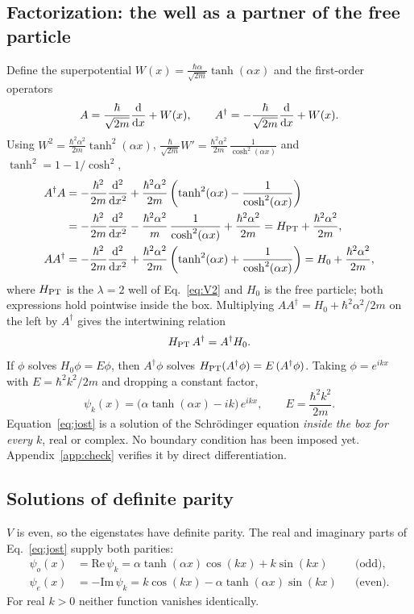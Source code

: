 \documentclass[11pt]{article}
\numberwithin{equation}{section}
\begin{document}
\subsection{Factorization: the well as a partner of the free particle}
Define the superpotential $W(x)=\frac{\hbar\alpha}{\sqrt{2m}}\tanh(\alpha x)$ and the first-order operators
\begin{equation}
A=\frac{\hbar}{\sqrt{2m}}\dv{x}+W(x),\qquad A^\dagger=-\frac{\hbar}{\sqrt{2m}}\dv{x}+W(x).
\end{equation}
Using $W^2=\frac{\hbar^2\alpha^2}{2m}\tanh^2(\alpha x)$, $\frac{\hbar}{\sqrt{2m}}W'=\frac{\hbar^2\alpha^2}{2m}\,\frac{1}{\cosh^2(\alpha x)}$ and $\tanh^2=1-1/\cosh^2$,
\begin{align}
A^\dagger A&=-\frac{\hbar^2}{2m}\dv[2]{x}+\frac{\hbar^2\alpha^2}{2m}\left(\tanh^2(\alpha x)-\frac{1}{\cosh^2(\alpha x)}\right)\nonumber\\
&=-\frac{\hbar^2}{2m}\dv[2]{x}-\frac{\hbar^2\alpha^2}{m}\,\frac{1}{\cosh^2(\alpha x)}+\frac{\hbar^2\alpha^2}{2m}=H_{\rm PT}+\frac{\hbar^2\alpha^2}{2m},\\
AA^\dagger&=-\frac{\hbar^2}{2m}\dv[2]{x}+\frac{\hbar^2\alpha^2}{2m}\left(\tanh^2(\alpha x)+\frac{1}{\cosh^2(\alpha x)}\right)=H_{0}+\frac{\hbar^2\alpha^2}{2m},
\end{align}
where $H_{\rm PT}$ is the $\lambda=2$ well of Eq.~\eqref{eq:V2} and $H_0$ is the free particle; both expressions hold pointwise inside the box. Multiplying $AA^\dagger=H_0+\hbar^2\alpha^2/2m$ on the left by $A^\dagger$ gives the intertwining relation
\begin{equation}
H_{\rm PT}\,A^\dagger=A^\dagger H_0 .
\label{eq:intertwine}
\end{equation}
If $\phi$ solves $H_0\phi=E\phi$, then $A^\dagger\phi$ solves $H_{\rm PT}(A^\dagger\phi)=E\,(A^\dagger\phi)$. Taking $\phi=e^{ikx}$ with $E=\hbar^2k^2/2m$ and dropping a constant factor,
\begin{equation}
\boxed{\;\psi_k(x)=\big(\alpha\tanh(\alpha x)-ik\big)\,e^{ikx},\qquad E=\frac{\hbar^2k^2}{2m}.\;}
\label{eq:jost}
\end{equation}
Equation~\eqref{eq:jost} is a solution of the Schr\"odinger equation \emph{inside the box for every $k$}, real or complex. No boundary condition has been imposed yet. Appendix~\ref{app:check} verifies it by direct differentiation.

\subsection{Solutions of definite parity}
$V$ is even, so the eigenstates have definite parity. The real and imaginary parts of Eq.~\eqref{eq:jost} supply both parities:
\begin{align}
\psi_o(x)&=\mathrm{Re}\,\psi_k=\alpha\tanh(\alpha x)\cos(kx)+k\sin(kx) &&\text{(odd)},\label{eq:psio}\\
\psi_e(x)&=-\mathrm{Im}\,\psi_k=k\cos(kx)-\alpha\tanh(\alpha x)\sin(kx) &&\text{(even)}.\label{eq:psie}
\end{align}
For real $k>0$ neither function vanishes identically.
\end{document}
